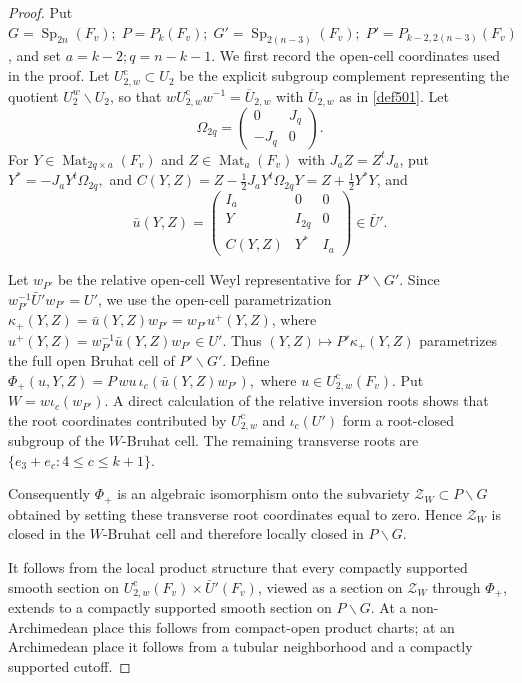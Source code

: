 \documentclass[11pt,notitlepage]{amsart}
\theoremstyle{definition}
\theoremstyle{remark}
\DeclareMathOperator{\Sp}{Sp}
\DeclareMathOperator{\Mat}{Mat}
\begin{document}
\begin{proof}
Put
$G=\Sp_{2n}(F_v);\; P=P_k(F_v);\;
G'=\Sp_{2(n-3)}(F_v);\;
P'=P_{k-2,2(n-3)}(F_v)$, and set $a=k-2; q=n-k-1$. We first record the open-cell coordinates used in the proof. Let
\(U_{2,w}^{\mathrm{c}}\subset U_2\) be the explicit subgroup complement
representing the quotient \(U_2^w\backslash U_2\), so that
$wU_{2,w}^{\mathrm{c}}w^{-1}=\overline U_{2,w}$ with \(\overline U_{2,w}\) as in \eqref{def501}. Let
\[
\Omega_{2q}=
\begin{pmatrix}
0&J_q\\
-J_q&0
\end{pmatrix}.
\]
For \(Y\in\Mat_{2q\times a}(F_v)\) and
\(Z\in\Mat_a(F_v)\) with \(J_aZ=Z^tJ_a\), put
$Y^*=-J_aY^t\Omega_{2q},$ and $C(Y,Z)
=
Z-\frac12J_aY^t\Omega_{2q}Y
=
Z+\frac12Y^*Y$, and
\[
\bar u(Y,Z)=
\begin{pmatrix}
I_a&0&0\\
Y&I_{2q}&0\\
C(Y,Z)&Y^*&I_a
\end{pmatrix}\in\bar U'.
\]

Let \(w_{P'}\) be the relative open-cell Weyl representative for
\(P'\backslash G'\). Since
$w_{P'}^{-1}\bar U'w_{P'}=U'$, we use the open-cell parametrization
$\kappa_+(Y,Z)
=
\bar u(Y,Z)w_{P'}
=
w_{P'}u^+(Y,Z)$, where
$u^+(Y,Z)
=
w_{P'}^{-1}\bar u(Y,Z)w_{P'}\in U'$.
Thus $(Y,Z)\longmapsto P'\kappa_+(Y,Z)$ parametrizes the full open Bruhat cell of \(P'\backslash G'\). Define
$\Phi_+(u,Y,Z)
=
P\,wu\,\iota_c\!\left(\bar u(Y,Z)w_{P'}\right),$ where $
u\in U_{2,w}^{\mathrm{c}}(F_v)$. Put $W=w\iota_c(w_{P'})$. 
A direct calculation of the relative inversion roots shows that the root
coordinates contributed by \(U_{2,w}^{\mathrm{c}}\) and
\(\iota_c(U')\) form a root-closed subgroup of the \(W\)-Bruhat cell.
The remaining transverse roots are $\{e_3+e_c:4\leq c\leq k+1\}$.

Consequently \(\Phi_+\) is an algebraic isomorphism onto the subvariety $\mathcal Z_W
\subset P\backslash G$ obtained by setting these transverse root coordinates equal to zero.
Hence \(\mathcal Z_W\) is closed in the \(W\)-Bruhat cell and therefore
locally closed in \(P\backslash G\).

It follows from the local product structure that every compactly
supported smooth section on $U_{2,w}^{\mathrm{c}}(F_v)\times\bar U'(F_v)$, viewed as a section on \(\mathcal Z_W\) through \(\Phi_+\), extends to a
compactly supported smooth section on \(P\backslash G\). At a
non-Archimedean place this follows from compact-open product charts; at
an Archimedean place it follows from a tubular neighborhood and a
compactly supported cutoff.


\end{proof}
\end{document}
